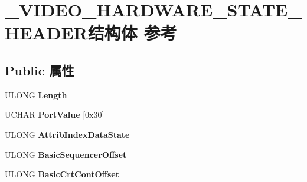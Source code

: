 \hypertarget{struct___v_i_d_e_o___h_a_r_d_w_a_r_e___s_t_a_t_e___h_e_a_d_e_r}{}\section{\+\_\+\+V\+I\+D\+E\+O\+\_\+\+H\+A\+R\+D\+W\+A\+R\+E\+\_\+\+S\+T\+A\+T\+E\+\_\+\+H\+E\+A\+D\+E\+R结构体 参考}
\label{struct___v_i_d_e_o___h_a_r_d_w_a_r_e___s_t_a_t_e___h_e_a_d_e_r}
\subsection*{Public 属性}
\begin{DoxyCompactItemize}
\item 
\mbox{\label{struct___v_i_d_e_o___h_a_r_d_w_a_r_e___s_t_a_t_e___h_e_a_d_e_r_a1cec7144181e3393196e3b8387caa0c6}} 
U\+L\+O\+NG {\bfseries Length}
\item 
\mbox{\label{struct___v_i_d_e_o___h_a_r_d_w_a_r_e___s_t_a_t_e___h_e_a_d_e_r_a71335e95e6ba8bd2bc6809aba64747dd}} 
U\+C\+H\+AR {\bfseries Port\+Value} \mbox{[}0x30\mbox{]}
\item 
\mbox{\label{struct___v_i_d_e_o___h_a_r_d_w_a_r_e___s_t_a_t_e___h_e_a_d_e_r_abd77a7d73f29e8bca7a5737597c805d5}} 
U\+L\+O\+NG {\bfseries Attrib\+Index\+Data\+State}
\item 
\mbox{\label{struct___v_i_d_e_o___h_a_r_d_w_a_r_e___s_t_a_t_e___h_e_a_d_e_r_ad6e7bec4e68e76abbf78bb572af6df80}} 
U\+L\+O\+NG {\bfseries Basic\+Sequencer\+Offset}
\item 
\mbox{\label{struct___v_i_d_e_o___h_a_r_d_w_a_r_e___s_t_a_t_e___h_e_a_d_e_r_ae459ea8e8fde86e1ad0467a89356ac55}} 
U\+L\+O\+NG {\bfseries Basic\+Crt\+Cont\+Offset}
\item 
\mbox{\label{struct___v_i_d_e_o___h_a_r_d_w_a_r_e___s_t_a_t_e___h_e_a_d_e_r_a932127e8cb1ae859147bded6a8de164b}} 

\end{DoxyCompactItemize}
